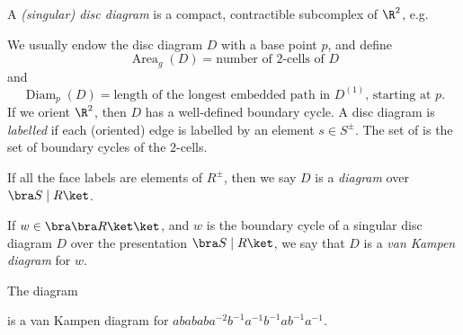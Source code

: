 \documentclass[a4paper]{article}
\DeclareMathOperator\Area{Area}
\DeclareMathOperator\Diam{Diam}
\begin{document}
\begin{defi}
  A \emph{(singular) disc diagram} is a compact, contractible subcomplex of $\R^2$, e.g.
  \begin{center}
  \end{center}
  We usually endow the disc diagram $D$ with a base point $p$, and define
  \[
    \Area_g(D) = \text{number of $2$-cells of $D$}
  \]
  and
  \[
    \Diam_p(D) = \text{length of the longest embedded path in $D^{(1)}$, starting at $p$}.
  \]
  If we orient $\R^2$, then $D$ has a well-defined boundary cycle. A disc diagram is \emph{labelled} if each (oriented) edge is labelled by an element $s \in S^{\pm}$. The set of  is the set of boundary cycles of the $2$-cells.

  If all the face labels are elements of $R^{\pm}$, then we say $D$ is a \emph{diagram} over $\bra S \mid R\ket$.
\end{defi}


\begin{defi}
  If $w \in \bra \bra R \ket \ket$, and $w$ is the boundary cycle of a singular disc diagram $D$ over the presentation $\bra S \mid R\ket$, we say that $D$ is a \emph{van Kampen diagram} for $w$.
\end{defi}
\begin{eg}
  The diagram
  \begin{center}
  \end{center}
  is a van Kampen diagram for $abababa^{-2}b^{-1} a^{-1}b^{-1}ab^{-1}a^{-1}$.
\end{eg}
\end{document}
